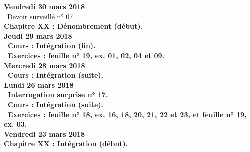 \documentclass[12pt,a4paper]{article}
\begin{document}
% 
% 
% 



\noindent\textbf{Vendredi 30 mars 2018}\\
\bu\ Devoir surveillé n° 07.\\
\bf Chapitre XX \rm : Dénombrement (début).\vspace{.4cm}\\

\noindent\textbf{Jeudi 29 mars 2018}\\
\bu\ Cours : Intégration (fin).\\
\bu\ Exercices : feuille n° 19, ex. 01, 02, 04 et 09.\vspace{.4cm}\\

\noindent\textbf{Mercredi 28 mars 2018} \\
\bu\ Cours : Intégration (suite).\vspace{.4cm}\\

\noindent\textbf{\bf Lundi 26 mars 2018} \\
\bu\ Interrogation surprise n° 17.\\
\bu\ Cours : Intégration (suite).\\
\bu\ Exercices : feuille n° 18, ex. 16, 18, 20, 21, 22 et 23, et feuille n° 19, ex. 03.\vspace{.4cm}\\

\noindent\textbf{Vendredi 23 mars 2018}\\
\bf Chapitre XX \rm : Intégration (début).\vspace{.4cm}\\
\end{document}
